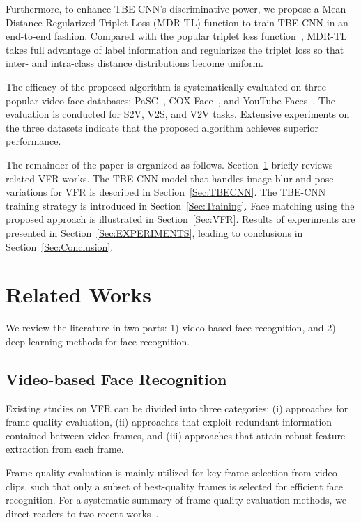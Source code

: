 \documentclass[10pt,journal,cspaper,compsoc]{IEEEtran}
\begin{document}
Furthermore, to enhance TBE-CNN's discriminative power, we propose a Mean Distance Regularized Triplet Loss (MDR-TL) function to train TBE-CNN in an end-to-end fashion.
Compared with the popular triplet loss function~\cite{schroff2015facenet}, MDR-TL takes full advantage of label information
and regularizes the triplet loss so that inter- and intra-class distance distributions become uniform.

The efficacy of the proposed algorithm is systematically evaluated on three popular video face databases:
PaSC~\cite{beveridge2013challenge}, COX Face~\cite{Huang2015Benchmark}, and YouTube Faces~\cite{wolf2011face}.
The evaluation is conducted for S2V, V2S, and V2V tasks.
Extensive experiments on the three datasets indicate that the proposed algorithm achieves superior performance.

The remainder of the paper is organized as follows. Section~\ref{Sec:Related} briefly reviews related VFR works.
The TBE-CNN model that handles image blur and pose variations for VFR is described in Section~\ref{Sec:TBECNN}.
The TBE-CNN training strategy is introduced in Section~\ref{Sec:Training}.
Face matching using the proposed approach is illustrated in Section~\ref{Sec:VFR}.
Results of experiments are presented in Section~\ref{Sec:EXPERIMENTS}, leading to conclusions in Section~\ref{Sec:Conclusion}.


\section{Related Works}
\label{Sec:Related}
We review the literature in two parts: 1) video-based face recognition, and 2) deep learning methods for face recognition.


\subsection{Video-based Face Recognition}
Existing studies on VFR can be divided into three categories:
(i) approaches for frame quality evaluation, (ii) approaches that exploit redundant information contained between video frames,
and (iii) approaches that attain robust feature extraction from each frame.

Frame quality evaluation is mainly utilized for key frame selection from video clips,
such that only a subset of best-quality frames is selected for efficient face recognition.
For a systematic summary of frame quality evaluation methods, we direct readers to two recent works~\cite{phillips2013existence,mau2013video}.
\end{document}
